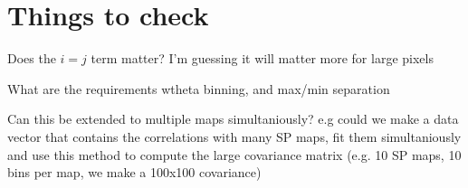 \documentclass[12pt]{article}
\begin{document}
\section{Things to check}

Does the $i=j$ term matter? I'm guessing it will matter more for large pixels 

What are the requirements  wtheta binning, and max/min separation

Can this be extended to multiple maps simultaniously? e.g could we make a data vector that contains the correlations with many SP maps, fit them simultaniously and use this method to compute the large covariance matrix (e.g. 10 SP maps, 10 bins per map, we make a 100x100 covariance)
\end{document}
